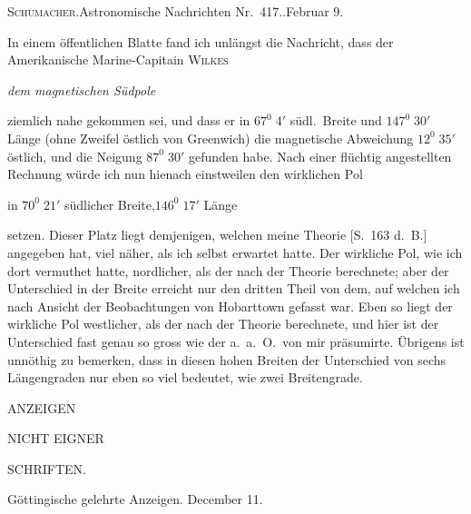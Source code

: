 \vspace{6mm}
\begin{center}\small\textsc{Schumacher}.\quad Astronomische Nachrichten Nr.\ 417..\quad Februar 9.\end{center}

In einem öffentlichen Blatte fand ich unlängst die Nachricht, dass der Amerikanische Marine-Capitain \textsc{Wilkes}
\begin{center}\textit{dem magnetischen Südpole}\end{center}
ziemlich nahe gekommen sei, und dass er in $67^0\;4'$ südl.\ Breite und $147^0\;30'$ Länge (ohne Zweifel östlich von Greenwich) die magnetische Abweichung $12^0\;35'$ östlich, und die Neigung $87^0\;30'$ gefunden habe. Nach einer flüchtig angestellten Rechnung würde ich nun hienach einstweilen den wirklichen Pol
\begin{center}in $70^0\;21'$ südlicher Breite,\qquad $146^0\;17'$ Länge\end{center}
setzen. Dieser Platz liegt demjenigen, welchen meine Theorie [S.\ 163 d.\ B.] angegeben hat, viel näher, als ich selbst erwartet hatte. Der wirkliche Pol, wie ich dort vermuthet hatte, nordlicher, als der nach der Theorie berechnete; aber der Unterschied in der Breite erreicht nur den dritten Theil von dem, auf welchen ich nach Ansicht der Beobachtungen von Hobarttown gefasst war. Eben so liegt der wirkliche Pol westlicher, als der nach der Theorie berechnete, und hier ist der Unterschied fast genau so gross wie der a.\ a.\ O.\ von mir präsumirte. Übrigens ist unnöthig zu bemerken, dass in diesen hohen Breiten der Unterschied von sechs Längengraden nur eben so viel bedeutet, wie zwei Breitengrade.

\clearpage
{}
\thispagestyle{empty}
\vspace*{35mm}
\begin{center}
{\LARGE ANZEIGEN}\par\vspace{16mm}
{\large NICHT EIGNER}\par\vspace{16mm}
{\LARGE SCHRIFTEN.}
\end{center}
\clearpage
{}
\begin{center}\small Göttingische gelehrte Anzeigen. December 11.\end{center}

